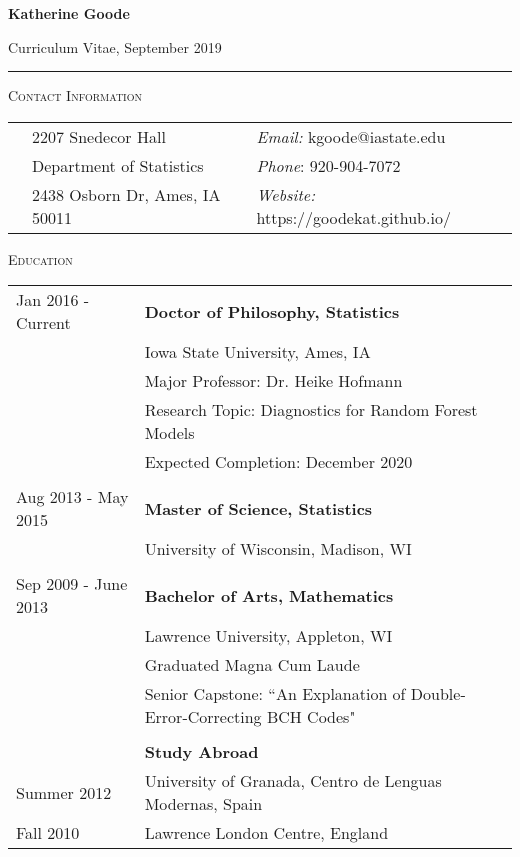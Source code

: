 \documentclass[10pt, oneside]{article}
\begin{document}
\begin{LARGE} \noindent\textbf{Katherine Goode} \end{LARGE} \hfill Curriculum Vitae, September 2019\\
\rule{\textwidth}{1pt}

\vspace{0.25cm}

\noindent \textsc{Contact Information} \hrulefill
\begin{longtable}{p{3.9cm}p{6.5cm}p{6.5cm}}
& 2207 Snedecor Hall & \emph{Email:} kgoode@iastate.edu\\
& Department of Statistics & \emph{Phone}: 920-904-7072\\
& 2438 Osborn Dr, Ames, IA 50011 & \emph{Website:} https://goodekat.github.io/
\end{longtable}

\noindent \textsc{Education} \hrulefill
\begin{longtable}{p{3.5cm}p{13cm}}
\hfill{Jan 2016 - Current} & \textbf{Doctor of Philosophy, Statistics}\\
& Iowa State University, Ames, IA\\
& Major Professor: Dr. Heike Hofmann\\
& Research Topic: Diagnostics for Random Forest Models\\
& Expected Completion: December 2020\\
\\
\hfill{Aug 2013 - May 2015} & \textbf{Master of Science, Statistics}\\
& University of Wisconsin, Madison, WI\\
\\
\hfill{Sep 2009 - June 2013} & \textbf{Bachelor of Arts, Mathematics}\\
& Lawrence University, Appleton, WI\\
& Graduated Magna Cum Laude\\
& Senior Capstone: ``An Explanation of Double-Error-Correcting BCH Codes"\\
\\
& \textbf{Study Abroad}\\
\hfill{Summer 2012} & \indent University of Granada, Centro de Lenguas Modernas, Spain\\
\hfill{Fall 2010} & \indent Lawrence London Centre, England
\end{longtable}
\end{document}
